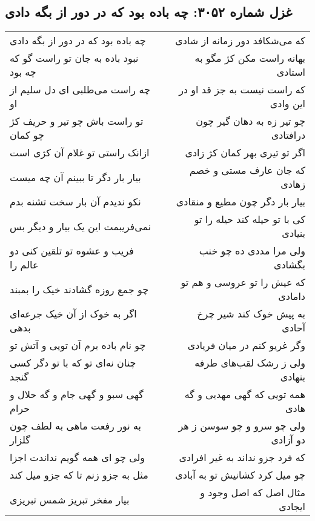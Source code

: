 \begin{center}
\section*{غزل شماره ۳۰۵۲: چه باده بود که در دور از بگه دادی}
\label{sec:3052}
\begin{longtable}{l p{0.5cm} r}
چه باده بود که در دور از بگه دادی
&&
که می‌شکافد دور زمانه از شادی
\\
نبود باده به جان تو راست گو که چه بود
&&
بهانه راست مکن کژ مگو به استادی
\\
چه راست می‌طلبی ای دل سلیم از او
&&
که راست نیست به جز قد او در این وادی
\\
تو راست باش چو تیر و حریف کژ چو کمان
&&
چو تیر زه به دهان گیر چون درافتادی
\\
ازانک راستی تو غلام آن کژی است
&&
اگر تو تیری بهر کمان کژ زادی
\\
بیار بار دگر تا ببینم آن چه میست
&&
که جان عارف مستی و خصم زهادی
\\
نکو ندیدم آن بار سخت تشنه بدم
&&
بیار بار دگر چون مطیع و منقادی
\\
نمی‌فریبمت این یک بیار و دیگر بس
&&
کی با تو حیله کند حیله را تو بنیادی
\\
فریب و عشوه تو تلقین کنی دو عالم را
&&
ولی مرا مددی ده چو خنب بگشادی
\\
چو جمع روزه گشادند خیک را بمبند
&&
که عیش را تو عروسی و هم تو دامادی
\\
اگر به خوک از آن خیک جرعه‌ای بدهی
&&
به پیش خوک کند شیر چرخ آحادی
\\
چو نام باده برم آن تویی و آتش تو
&&
وگر غریو کنم در میان فریادی
\\
چنان نه‌ای تو که با تو دگر کسی گنجد
&&
ولی ز رشک لقب‌های طرفه بنهادی
\\
گهی سبو و گهی جام و گه حلال و حرام
&&
همه تویی که گهی مهدیی و گه هادی
\\
به نور رفعت ماهی به لطف چون گلزار
&&
ولی چو سرو و چو سوسن ز هر دو آزادی
\\
ولی چو ای همه گویم نداندت اجزا
&&
که فرد جزو نداند به غیر افرادی
\\
مثل به جزو زنم تا که جزو میل کند
&&
چو میل کرد کشانیش تو به آبادی
\\
بیار مفخر تبریز شمس تبریزی
&&
مثال اصل که اصل وجود و ایجادی
\\
\end{longtable}
\end{center}
